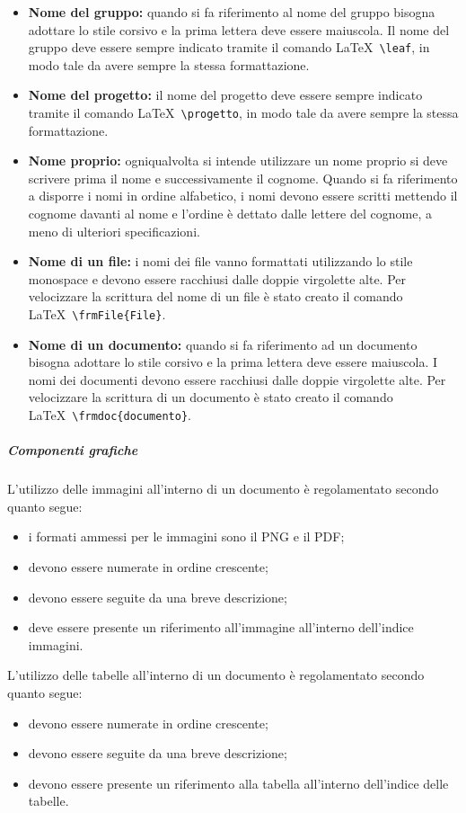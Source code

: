 \documentclass[../NormeProgetto.tex]{subfiles}
\begin{document}
				\begin{itemize}
					\item \textbf{Nome del gruppo:} quando si fa riferimento al nome del gruppo bisogna adottare lo stile corsivo e la prima lettera deve essere maiuscola.	
				Il nome del gruppo deve essere sempre indicato tramite il comando \LaTeX\ \texttt{\textbackslash leaf}, in modo tale da avere sempre la stessa formattazione.
				\item \textbf{Nome del progetto:} il nome del progetto deve essere sempre indicato tramite il comando \LaTeX\ \texttt{\textbackslash progetto}, in modo tale da avere sempre la stessa formattazione.
				\item \textbf{Nome proprio:} ogniqualvolta si intende utilizzare un nome proprio si deve scrivere prima il nome e successivamente il cognome. Quando si fa riferimento a disporre i nomi in ordine alfabetico, i nomi devono essere scritti mettendo il cognome davanti al nome e l'ordine è dettato dalle lettere del cognome, a meno di ulteriori specificazioni.				
				\item \textbf{Nome di un file:} i nomi dei file vanno formattati utilizzando lo stile monospace e devono essere racchiusi dalle doppie virgolette alte.  Per velocizzare la scrittura del nome di un file è stato creato il comando \LaTeX\ \texttt{\textbackslash frmFile\{File\}}.				
				\item \textbf{Nome di un documento:} quando si fa riferimento ad un documento bisogna adottare lo stile corsivo e la prima lettera deve essere maiuscola. I  nomi dei documenti devono essere racchiusi dalle doppie virgolette alte. Per velocizzare la scrittura di un documento è stato creato il comando \LaTeX\ \texttt{\textbackslash frmdoc\{documento\}}.				
				\end{itemize}

		\subparagraph{Componenti grafiche}
			L'utilizzo delle immagini all'interno di un documento è regolamentato secondo quanto segue:
			\begin{itemize}
				\item i formati ammessi per le immagini sono il PNG e il PDF;
				\item devono essere numerate in ordine crescente;
				\item devono essere seguite da una breve descrizione;
				\item deve essere presente un riferimento all'immagine all'interno dell'indice immagini.
			\end{itemize}
			L'utilizzo delle tabelle all'interno di un documento è regolamentato secondo quanto segue:
			\begin{itemize}
				\item devono essere numerate in ordine crescente;
				\item devono essere seguite da una breve descrizione;
				\item devono essere presente un riferimento alla tabella all'interno dell'indice delle tabelle.
			\end{itemize}
			
\end{document}
